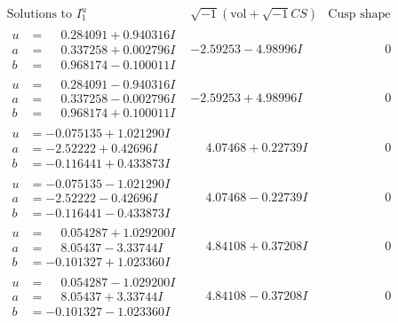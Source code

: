 \documentclass[1p]{elsarticle_modified}
\theoremstyle{definition}
\newcommand{\I}{\sqrt{-1}}
\begin{document}
$$\begin{array}{c|c|c}  
\text{Solutions to }I^u_{1}& \I (\text{vol} + \sqrt{-1}CS) & \text{Cusp shape}\\
 \hline 
\begin{aligned}
u &= \phantom{-}0.284091 + 0.940316 I \\
a &= \phantom{-}0.337258 + 0.002796 I \\
b &= \phantom{-}0.968174 - 0.100011 I\end{aligned}
 & -2.59253 - 4.98996 I & \phantom{-0.000000 } 0 \\ \hline\begin{aligned}
u &= \phantom{-}0.284091 - 0.940316 I \\
a &= \phantom{-}0.337258 - 0.002796 I \\
b &= \phantom{-}0.968174 + 0.100011 I\end{aligned}
 & -2.59253 + 4.98996 I & \phantom{-0.000000 } 0 \\ \hline\begin{aligned}
u &= -0.075135 + 1.021290 I \\
a &= -2.52222 + 0.42696 I \\
b &= -0.116441 + 0.433873 I\end{aligned}
 & \phantom{-}4.07468 + 0.22739 I & \phantom{-0.000000 } 0 \\ \hline\begin{aligned}
u &= -0.075135 - 1.021290 I \\
a &= -2.52222 - 0.42696 I \\
b &= -0.116441 - 0.433873 I\end{aligned}
 & \phantom{-}4.07468 - 0.22739 I & \phantom{-0.000000 } 0 \\ \hline\begin{aligned}
u &= \phantom{-}0.054287 + 1.029200 I \\
a &= \phantom{-}8.05437 - 3.33744 I \\
b &= -0.101327 + 1.023360 I\end{aligned}
 & \phantom{-}4.84108 + 0.37208 I & \phantom{-0.000000 } 0 \\ \hline\begin{aligned}
u &= \phantom{-}0.054287 - 1.029200 I \\
a &= \phantom{-}8.05437 + 3.33744 I \\
b &= -0.101327 - 1.023360 I\end{aligned}
 & \phantom{-}4.84108 - 0.37208 I & \phantom{-0.000000 } 0 \\ \hline\begin{aligned}

\end{aligned}
\end{array}$$
\end{document}
